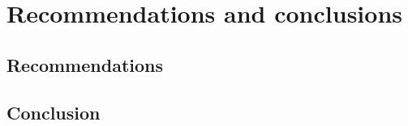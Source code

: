 \section{Recommendations and conclusions}

\subsection{Recommendations}







\subsection{Conclusion}